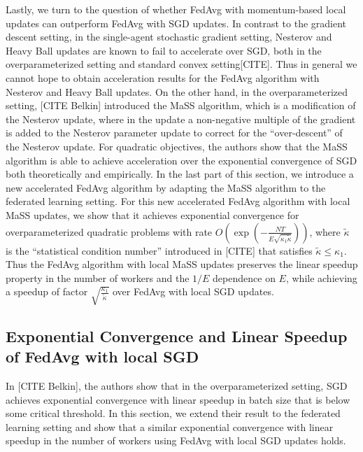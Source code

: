 Lastly, we turn to the question of whether FedAvg with momentum-based
local updates can outperform FedAvg with SGD updates. In contrast
to the gradient descent setting, in the single-agent stochastic gradient
setting, Nesterov and Heavy Ball updates are known to fail to accelerate
over SGD, both in the overparameterized setting and standard convex
setting{[}CITE{]}. Thus in general we cannot hope to obtain acceleration
results for the FedAvg algorithm with Nesterov and Heavy Ball updates.
On the other hand, in the overparameterized setting, {[}CITE Belkin{]}
introduced the MaSS algorithm, which is a modification of the Nesterov
update, where in the update a non-negative multiple of the gradient
is added to the Nesterov parameter update to correct for the ``over-descent''
of the Nesterov update. For quadratic objectives, the authors show
that the MaSS algorithm is able to achieve acceleration over the exponential
convergence of SGD both theoretically and empirically. In the last
part of this section, we introduce a new accelerated FedAvg algorithm
by adapting the MaSS algorithm to the federated learning setting.
For this new accelerated FedAvg algorithm with local MaSS updates,
we show that it achieves exponential convergence for overparameterized
quadratic problems with rate $O(\exp(-\frac{NT}{E\sqrt{\kappa_{1}\tilde{\kappa}}}))$,
where $\tilde{\kappa}$ is the ``statistical condition number''
introduced in {[}CITE{]} that satisfies $\tilde{\kappa}\leq\kappa_{1}$.
Thus the FedAvg algorithm with local MaSS updates preserves the linear
speedup property in the number of workers and the $1/E$ dependence
on $E$, while achieving a speedup of factor $\sqrt{\frac{\kappa_{1}}{\tilde{\kappa}}}$
over FedAvg with local SGD updates. 

\subsection{Exponential Convergence and Linear Speedup of FedAvg with local SGD }

In {[}CITE Belkin{]}, the authors show that in the overparameterized
setting, SGD achieves exponential convergence with linear speedup
in batch size that is below some critical threshold. In this section,
we extend their result to the federated learning setting and show
that a similar exponential convergence with linear speedup in the
number of workers using FedAvg with local SGD updates holds. 

